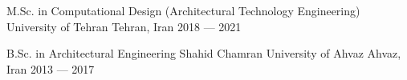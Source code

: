 

\begin{cventries}
	
	\cventry
	{M.Sc. in Computational Design (Architectural Technology Engineering)} %
	{University of Tehran} %
	{Tehran, Iran} %
	{\textcolor{neutraltext}{2018 --- 2021}} %
	{}
	
	\cventry
	{B.Sc. in Architectural Engineering} %
	{Shahid Chamran University of Ahvaz} %
	{Ahvaz, Iran} %
	{\textcolor{neutraltext}{2013 --- 2017}} %
	{}
	
	
	
\end{cventries}
